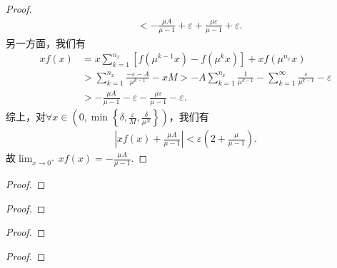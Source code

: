 \documentclass[../../main.tex]{subfiles}
\begin{document}
\begin{proof}
\begin{align*}
&< -\frac{\mu A}{\mu - 1} + \varepsilon + \frac{\mu \varepsilon}{\mu - 1} + \varepsilon.
\end{align*}
另一方面，我们有
\begin{align*}
xf\left( x \right) &= x\sum_{k=1}^{n_x} \left[ f\left( \mu^{k-1}x \right) - f\left( \mu^k x \right) \right] + xf\left( \mu^{n_x} x \right) \\
&> \sum_{k=1}^{n_x} \frac{-\varepsilon - A}{\mu^{k-1}} - xM > -A\sum_{k=1}^{n_x} \frac{1}{\mu^{k-1}} - \sum_{k=1}^{\infty} \frac{\varepsilon}{\mu^{k-1}} - \varepsilon \\
&> -\frac{\mu A}{\mu - 1} - \varepsilon - \frac{\mu \varepsilon}{\mu - 1} - \varepsilon.
\end{align*}
综上，对$\forall x \in \left( 0,\min \left\{ \delta, \frac{\varepsilon}{M}, \frac{\delta}{\mu^N} \right\} \right)$，我们有
\begin{align*}
\left| xf\left( x \right) + \frac{\mu A}{\mu - 1} \right| < \varepsilon \left( 2 + \frac{\mu}{\mu - 1} \right).
\end{align*}
故$\lim_{x \to 0^+} xf\left( x \right) = -\frac{\mu A}{\mu - 1}.$

\end{proof}

\begin{example}

\end{example}
\begin{proof}


\end{proof}

\begin{example}

\end{example}
\begin{proof}


\end{proof}

\begin{example}

\end{example}
\begin{proof}


\end{proof}

\begin{example}

\end{example}
\begin{proof}


\end{proof}
\end{document}
